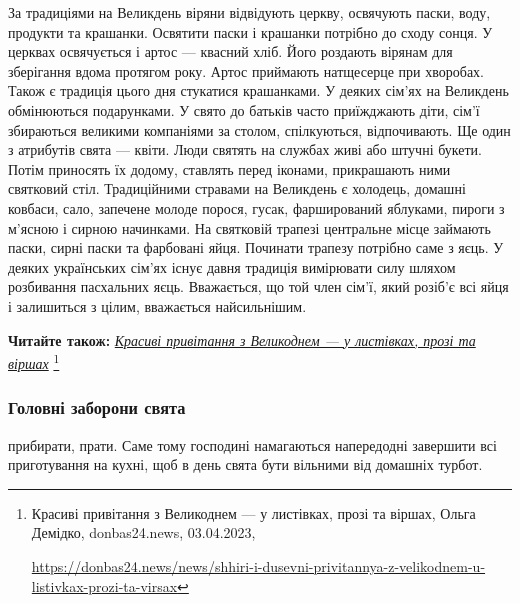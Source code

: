 За традиціями на Великдень віряни відвідують церкву, освячують паски, воду,
продукти та крашанки. Освятити паски і крашанки потрібно до сходу сонця. У
церквах освячується і артос — квасний хліб. Його роздають вірянам для
зберігання вдома протягом року. Артос приймають натщесерце при хворобах. Також
є традиція цього дня стукатися крашанками. У деяких сім'ях на Великдень
обмінюються подарунками. У свято до батьків часто приїжджають діти, сім'ї
збираються великими компаніями за столом, спілкуються, відпочивають. Ще один з
атрибутів свята — квіти. Люди святять на службах живі або штучні букети. Потім
приносять їх додому, ставлять перед іконами, прикрашають ними святковий стіл.
Традиційними стравами на Великдень є холодець, домашні ковбаси, сало, запечене
молоде порося, гусак, фарширований яблуками, пироги з м’ясною і сирною
начинками. На святковій трапезі центральне місце займають паски, сирні паски та
фарбовані яйця. Починати трапезу потрібно саме з яєць. У деяких українських
сім'ях існує давня традиція вимірювати силу шляхом розбивання пасхальних яєць.
Вважається, що той член сім'ї, який розіб'є всі яйця і залишиться з цілим,
вважається найсильнішим.

\textbf{Читайте також:} \href{https://donbas24.news/news/shhiri-i-dusevni-privitannya-z-velikodnem-u-listivkax-prozi-ta-virsax}{\emph{Красиві привітання з Великоднем — у листівках, прозі та віршах}}%
\footnote{Красиві привітання з Великоднем — у листівках, прозі та віршах, Ольга Демідко, donbas24.news, 03.04.2023, \par%
\url{https://donbas24.news/news/shhiri-i-dusevni-privitannya-z-velikodnem-u-listivkax-prozi-ta-virsax}%
}


\subsubsection{Головні заборони свята}

прибирати, прати. Саме тому господині намагаються напередодні завершити всі
приготування на кухні, щоб в день свята бути вільними від домашніх турбот.

